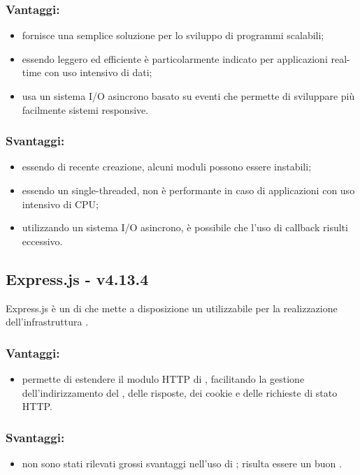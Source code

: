 \documentclass[a4paper, titlepage]{article}
\begin{document}
\subsubsection{Vantaggi:}
\begin{itemize}
	\item fornisce una semplice soluzione per lo sviluppo di programmi scalabili;
	\item essendo leggero ed efficiente è particolarmente indicato per applicazioni real-time con uso intensivo di dati;
	\item usa un sistema I/O asincrono basato su eventi che permette di sviluppare più facilmente sistemi responsive.
\end{itemize}

\subsubsection{Svantaggi:}
\begin{itemize}
	\item essendo di recente creazione, alcuni moduli possono essere instabili;
	\item essendo un  single-threaded, non è performante in caso di applicazioni con uso
	intensivo di CPU;
	\item utilizzando un sistema I/O asincrono, è possibile che l’uso di callback risulti eccessivo.
\end{itemize}

\subsection{Express.js - v4.13.4}
Express.js è un  di  che mette a disposizione un  utilizzabile per la realizzazione dell’infrastruttura .

\subsubsection{Vantaggi:}
\begin{itemize}
	\item permette di estendere il modulo HTTP di , facilitando la gestione dell’indirizzamento del , delle risposte, dei cookie e delle richieste di stato HTTP.
\end{itemize}

\subsubsection{Svantaggi:}
\begin{itemize}
	\item non sono stati rilevati grossi svantaggi nell'uso di ; risulta essere un buon .
\end{itemize}
\end{document}
